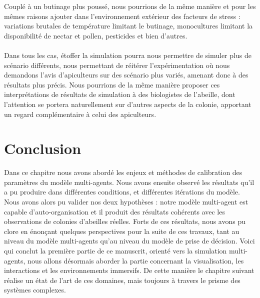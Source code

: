 	Couplé à un butinage plus poussé, nous pourrions de la même manière et pour les mêmes raisons ajouter dans l'environnement extérieur des facteurs de stress : variations brutales de température limitant le butinage, monocultures limitant la disponibilité de nectar et pollen, pesticides et bien d'autres.
	
	\paragraph{}
	Dans tous les cas, étoffer la simulation pourra nous permettre de simuler plus de scénario différents, nous permettant de réitérer l'expérimentation où nous demandons l'avis d'apiculteurs sur des scénario plus variés, amenant donc à des résultats plus précis. Nous pourrions de la même manière proposer ces interprétations de résultats de simulation à des biologistes de l'abeille, dont l'attention se portera naturellement sur d'autres aspects de la colonie, apportant un regard complémentaire à celui des apiculteurs.
	
	
			
	\section*{Conclusion}
	Dans ce chapitre nous avons abordé les enjeux et méthodes de calibration des paramètres du modèle multi-agents. Nous avons ensuite observé les résultats qu'il a pu produire dans différentes conditions, et différentes itérations du modèle. Nous avons alors pu valider nos deux hypothèses : notre modèle multi-agent est capable d'auto-organisation et il produit des résultats cohérents avec les observations de colonies d'abeilles réelles. Forts de ces résultats, nous avons pu clore en énonçant quelques perspectives pour la suite de ces travaux, tant au niveau du modèle multi-agents qu'au niveau du modèle de prise de décision. Voici qui conclut la première partie de ce manuscrit, orienté vers la simulation multi-agents, nous allons désormais aborder la partie concernant la visualisation, les interactions et les environnements immersifs. De cette manière le chapitre suivant réalise un état de l'art de ces domaines, mais toujours à travers le prisme des systèmes complexes.